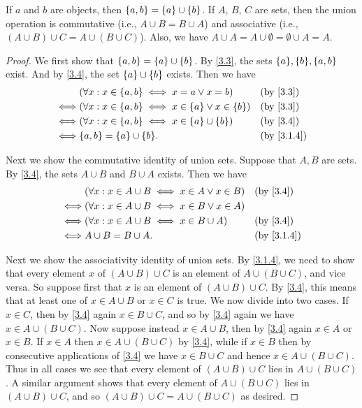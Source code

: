 \begin{lem}\label{3.1.13}
  If \(a\) and \(b\) are objects, then \(\left\lbrace a, b\right\rbrace = \left\lbrace a\right\rbrace \cup \left\lbrace b\right\rbrace\).
  If \(A\), \(B\), \(C\) are sets, then the union operation is commutative (i.e., \(A \cup B = B \cup A\)) and associative (i.e., \((A \cup B) \cup C = A \cup (B \cup C)\)).
  Also, we have \(A \cup A = A \cup \emptyset = \emptyset \cup A = A\).
\end{lem}

\begin{proof}
  We first show that \(\left\lbrace a, b\right\rbrace = \left\lbrace a\right\rbrace \cup \left\lbrace b\right\rbrace\).
  By \cref{3.3}, the sets \(\set{a}, \set{b}, \set{a, b}\) exist.
  And by \cref{3.4}, the set \(\left\lbrace a\right\rbrace \cup \left\lbrace b\right\rbrace\) exists.
  Then we have
  \begin{align*}
         & (\forall x : x \in \set{a, b} \iff x = a \lor x = b)                 &  & \text{(by \cref{3.3})} \\
    \iff & (\forall x : x \in \set{a, b} \iff x \in \set{a} \lor x \in \set{b}) &  & \text{(by \cref{3.3})} \\
    \iff & (\forall x : x \in \set{a, b} \iff x \in \set{a} \cup \set{b})       &  & \text{(by \cref{3.4})} \\
    \iff & \set{a, b} = \set{a} \cup \set{b}.                                   &  & \by{3.1.4}
  \end{align*}

  Next we show the commutative identity of union sets.
  Suppose that \(A, B\) are sets.
  By \cref{3.4}, the sets \(A \cup B\) and \(B \cup A\) exists.
  Then we have
  \begin{align*}
         & (\forall x : x \in A \cup B \iff x \in A \lor x \in B) &  & \text{(by \cref{3.4})} \\
    \iff & (\forall x : x \in A \cup B \iff x \in B \lor x \in A)                             \\
    \iff & (\forall x : x \in A \cup B \iff x \in B \cup A)       &  & \text{(by \cref{3.4})} \\
    \iff & A \cup B = B \cup A.                                   &  & \by{3.1.4}
  \end{align*}

  Next we show the associativity identity of union sets.
  By \cref{3.1.4}, we need to show that every element \(x\) of \((A \cup B) \cup C\) is an element of \(A \cup (B \cup C)\), and vice versa.
  So suppose first that \(x\) is an element of \((A \cup B) \cup C\).
  By \cref{3.4}, this means that at least one of \(x \in A \cup B\) or \(x \in C\) is true.
  We now divide into two cases.
  If \(x \in C\), then by \cref{3.4} again \(x \in B \cup C\), and so by \cref{3.4} again we have \(x \in A \cup (B \cup C)\).
  Now suppose instead \(x \in A \cup B\), then by \cref{3.4} again \(x \in A\) or \(x \in B\).
  If \(x \in A\) then \(x \in A \cup (B \cup C)\) by \cref{3.4}, while if \(x \in B\) then by consecutive applications of \cref{3.4} we have \(x \in B \cup C\) and hence \(x \in A \cup (B \cup C)\).
  Thus in all cases we see that every element of \((A \cup B) \cup C\) lies in \(A \cup (B \cup C)\).
  A similar argument shows that every element of \(A \cup (B \cup C)\) lies in \((A \cup B) \cup C\), and so \((A \cup B) \cup C = A \cup (B \cup C) \) as desired.


\end{proof}
